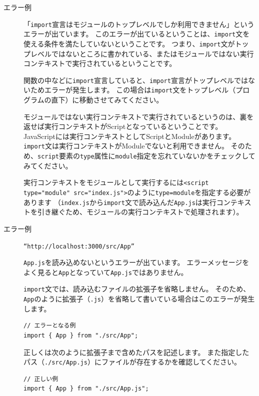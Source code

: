 \begin{description}
\item[エラー例] 

「\texttt{import}宣言はモジュールのトップレベルでしか利用できません」というエラーが出ています。
このエラーが出ているということは、\texttt{import}文を使える条件を満たしていないということです。
つまり、\texttt{import}文がトップレベルではないところに書かれている、またはモジュールではない実行コンテキストで実行されているということです。

関数の中などに\texttt{import}宣言していると、\texttt{import}宣言がトップレベルではないためエラーが発生します。
この場合は\texttt{import}文をトップレベル（プログラムの直下）に移動させてみてください。

モジュールではない実行コンテキストで実行されているというのは、裏を返せば実行コンテキストがScriptとなっているということです。
JavaScriptには実行コンテキストとしてScriptとModuleがあります。
\texttt{import}文は実行コンテキストがModuleでないと利用できません。
そのため、\texttt{script}要素の\texttt{type}属性に\texttt{module}指定を忘れていないかをチェックしてみてください。

実行コンテキストをモジュールとして実行するには\texttt{<script type="module" src="index.js">}のように\texttt{type=module}を指定する必要があります
（\texttt{index.js}から\texttt{import}文で読み込んだ\texttt{App.js}は実行コンテキストを引き継ぐため、モジュールの実行コンテキストで処理されます）。

\item[エラー例] \texttt{``http://localhost:3000/src/App''}

\texttt{App.js}を読み込めないというエラーが出ています。
エラーメッセージをよく見ると\texttt{App}となっていて\texttt{App.js}ではありません。

\texttt{import}文では、読み込むファイルの拡張子を省略しません。
そのため、\texttt{App}のように拡張子（\texttt{.js}）を省略して書いている場合はこのエラーが発生します。

\begin{lstlisting}
// エラーとなる例
import { App } from "./src/App";
\end{lstlisting}

正しくは次のように拡張子まで含めたパスを記述します。
また指定したパス（\texttt{./src/App.js}）にファイルが存在するかを確認してください。

\begin{lstlisting}
// 正しい例
import { App } from "./src/App.js";
\end{lstlisting}
\end{description}


